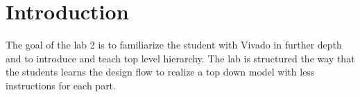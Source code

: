 \section{Introduction}\label{sec: Introduction}
The goal of the lab 2 is to familiarize the student with Vivado in further depth and to introduce and teach top level hierarchy. The lab is structured the way that the students learns the design flow to realize a top down model with less instructions for each part.
